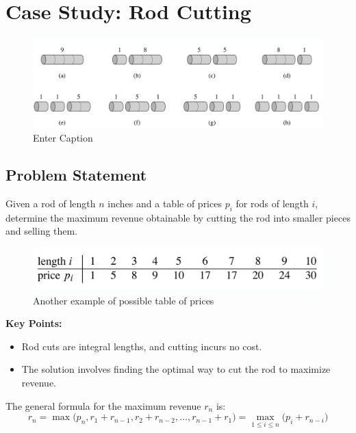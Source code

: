 \section{Case Study: Rod Cutting}
\begin{figure}[h!]
    \centering
    \includegraphics[width=1\linewidth]{immagini//capitolo 13/13_2.png}
    \caption{Enter Caption}
    \label{Example 1, here we show eight possible ways to cut a rod of lenght 4, the prices are shown on top}
\end{figure}
\subsection{Problem Statement}
Given a rod of length \(n\) inches and a table of prices \(p_i\) for rods of length \(i\), determine the maximum revenue obtainable by cutting the rod into smaller pieces and selling them.
\begin{figure}[h!]
    \centering
    \includegraphics[width=1\linewidth]{immagini//capitolo 13/13_1.png}
    \caption{Another example of possible table of prices}
    \label{fig:enter-label}
\end{figure}
\textbf{Key Points:}
\begin{itemize}
    \item Rod cuts are integral lengths, and cutting incurs no cost.
    \item The solution involves finding the optimal way to cut the rod to maximize revenue.
\end{itemize}
The general formula for the maximum revenue \(r_n\) is:
\[
r_n = \max \big( p_n, r_1 + r_{n-1}, r_2 + r_{n-2}, \dots, r_{n-1} + r_1 \big) = \max_{1 \leq i \leq n} \big( p_i + r_{n-i} \big)
\]

